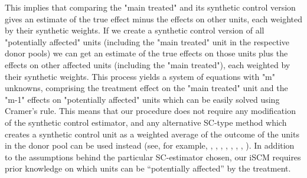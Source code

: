 This implies that comparing the "main treated" and its synthetic control version gives an estimate of the true effect minus the effects on other units, each weighted by their synthetic weights. If we create a synthetic control version of all "potentially affected" units (including the "main treated" unit in the respective donor pools) we can get an estimate of the true effects on those units plus the effects on other affected units (including the "main treated"), each weighted by their synthetic weights. This process yields a system of equations with "m" unknowns, comprising the treatment effect on the "main treated" unit and the "m-1" effects on "potentially affected" units which can be easily solved using Cramer's rule. This means that our procedure does not require any modification of the synthetic control estimator, and any alternative SC-type method which creates a synthetic control unit as a weighted average of the outcome of the units in the donor pool can be used instead (see, for example, \citealt{Aba2019}, \citealt{Amj2018}, \citealt{Ben2020}, \citealt{Ben2019}, \citealt{Dou2016}, \citealt{Fer2019}, \citealt{Kel2020},  \citealt{Xu2017}). In addition to the assumptions behind the particular SC-estimator chosen, our iSCM requires prior knowledge on which units can be ``potentially affected'' by the treatment.  
